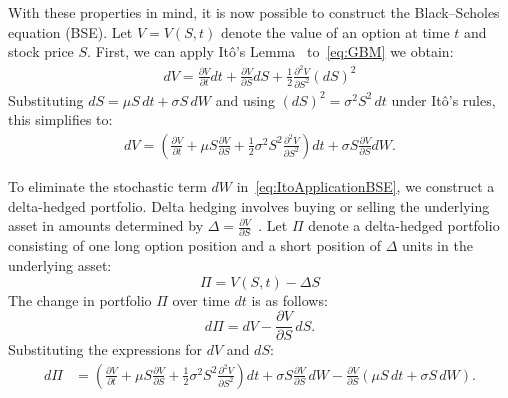 \documentclass[11pt]{report}
\begin{document}
With these properties in mind, it is now possible to construct the Black--Scholes equation (BSE).
Let $V = V\left(S,t\right)$ denote the value of an option at time $t$ and stock price $S$.
First, we can apply Itô's Lemma~\cite{alma991008758143208046} to~\ref{eq:GBM} we obtain:
\begin{align}
  dV = \frac{\partial V}{\partial t} dt 
  + \frac{\partial V}{\partial S} dS  
  + \frac{1}{2} \frac{\partial^{2} V}{\partial S^2} \left(dS\right)^2
\end{align}
Substituting $dS = \mu S\,dt + \sigma S\,dW$ and using $(dS)^2 = 
\sigma^2 S^2\,dt$ under It\^{o}'s rules, this simplifies to:
\begin{align}
    dV =
  \left(
  \frac{\partial V}{\partial t}
  + \mu S \frac{\partial V}{\partial S}
  + \frac{1}{2}\sigma^2 S^2 \frac{\partial^2 V}{\partial S^2}
  \right)dt
  +
  \sigma S \frac{\partial V}{\partial S}dW.
  \label{eq:ItoApplicationBSE}
\end{align}

To eliminate the stochastic term $dW$ in~\eqref{eq:ItoApplicationBSE}, we construct a delta-hedged portfolio.
Delta hedging involves buying or selling 
the underlying asset in amounts determined 
by $\Delta = \frac{\partial V}{\partial S}$~\cite{alma991008837579408046}. 
Let $\Pi$ denote a delta-hedged portfolio consisting
 of one long option position and a 
 short position of $\Delta$ units in the underlying asset:
\begin{equation}
 \Pi = V\left(S,t\right) - \Delta S
\end{equation}
The change in portfolio $\Pi$ over time $dt$ is as follows: 
\begin{equation}
    d\Pi = dV - \frac{\partial V}{\partial S}\,dS.
\end{equation}
Substituting the expressions for $dV$ and $dS$:
\begin{align}
    d\Pi &= \left(\frac{\partial V}{\partial t} 
              + \mu S \frac{\partial V}{\partial S}  
              + \frac{1}{2}\sigma^2 S^2 \frac{\partial^{2} V}{\partial S^2}
            \right)dt 
          + \sigma S \frac{\partial V}{\partial S}\,dW 
          - \frac{\partial V}{\partial S}\left(\mu S\,dt 
          + \sigma S\,dW\right).
\end{align}
\end{document}
